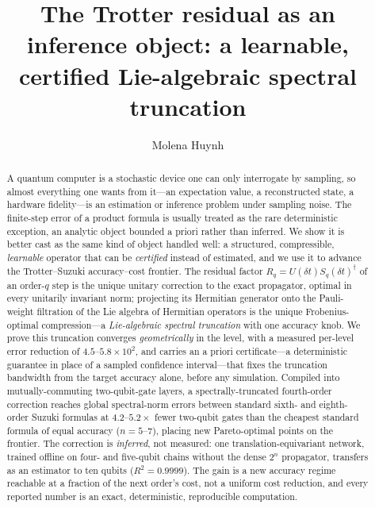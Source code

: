 \documentclass[aps,prresearch,reprint,superscriptaddress,nofootinbib,amsmath,amssymb]{revtex4-2}
\newcommand{\dt}{\delta t}
\begin{document}
\title{The Trotter residual as an inference object: a learnable, certified Lie-algebraic spectral truncation}
\author{Molena Huynh}

\begin{abstract}
A quantum computer is a stochastic device one can only interrogate by sampling, so almost everything one wants from it---an expectation value, a reconstructed state, a hardware fidelity---is an estimation or inference problem under sampling noise. The finite-step error of a product formula is usually treated as the rare deterministic exception, an analytic object bounded a priori rather than inferred. We show it is better cast as the same kind of object handled well: a structured, compressible, \emph{learnable} operator that can be \emph{certified} instead of estimated, and we use it to advance the Trotter--Suzuki accuracy--cost frontier. The residual factor $R_q=U(\dt)S_q(\dt)^\dagger$ of an order-$q$ step is the unique unitary correction to the exact propagator, optimal in every unitarily invariant norm; projecting its Hermitian generator onto the Pauli-weight filtration of the Lie algebra of Hermitian operators is the unique Frobenius-optimal compression---a \emph{Lie-algebraic spectral truncation} with one accuracy knob. We prove this truncation converges \emph{geometrically} in the level, with a measured per-level error reduction of $4.5$--$5.8\times10^{2}$, and carries an a priori certificate---a deterministic guarantee in place of a sampled confidence interval---that fixes the truncation bandwidth from the target accuracy alone, before any simulation. Compiled into mutually-commuting two-qubit-gate layers, a spectrally-truncated fourth-order correction reaches global spectral-norm errors between standard sixth- and eighth-order Suzuki formulas at $4.2$--$5.2\times$ fewer two-qubit gates than the cheapest standard formula of equal accuracy ($n=5$--$7$), placing new Pareto-optimal points on the frontier. The correction is \emph{inferred}, not measured: one translation-equivariant network, trained offline on four- and five-qubit chains without the dense $2^n$ propagator, transfers as an estimator to ten qubits ($R^2=0.9999$). The gain is a new accuracy regime reachable at a fraction of the next order's cost, not a uniform cost reduction, and every reported number is an exact, deterministic, reproducible computation.
\end{abstract}

\maketitle
\end{document}
